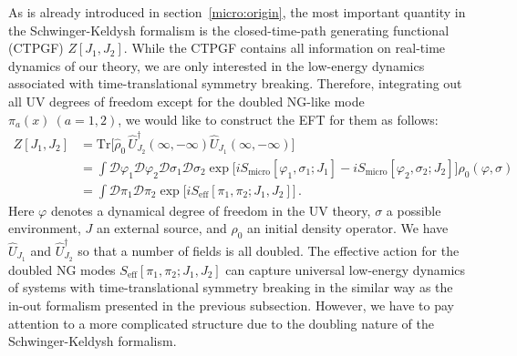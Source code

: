 \documentclass[a4paper,11pt]{article}
\begin{document}
As is already introduced in section~\ref{micro:origin}, 
the most important quantity in the Schwinger-Keldysh formalism is 
the closed-time-path generating functional (CTPGF) $Z[J_1, J_2]$. 
While the CTPGF contains all information on real-time dynamics of our theory, 
we are only interested in the low-energy dynamics associated with 
time-translational symmetry breaking. 
Therefore, integrating out all UV degrees of freedom except for the 
doubled NG-like mode $\pi_a(x) ~(a=1,2)$, 
we would like to construct the EFT for them as follows:
\begin{align}
\nonumber
  Z[J_1, J_2] 
  &= \mathrm{Tr} \Big[\hat{\rho}_0 \,
  \hat{U}_{J_2}^\dagger(\infty,-\infty)
  \hat{U}_{J_1} (\infty,-\infty) \Big]\,  \\
\nonumber
  &=\int \mathcal{D} \varphi_1 \mathcal{D} \varphi_2
  \mathcal{D} \sigma_1 \mathcal{D} \sigma_2
  \exp \Big[
  iS_{\mathrm{micro}} [\varphi_1,\sigma_1;J_1] 
 - iS_{\mathrm{micro}} [\varphi_2,\sigma_2;J_2] \Big]  
  \rho_0 (\varphi,\sigma) 
  \, \\
  &= \int \mathcal{D} \pi_1 \mathcal{D} \pi_2
  \exp \Big[
  iS_{\mathrm{eff}} [\pi_1,\pi_2;J_1,J_2] \Big]\, .
 \label{eq:CTPGF}
\end{align}
Here $\varphi$ denotes a dynamical degree of freedom in the UV theory, 
$\sigma$ a possible environment, $J$ an external source,
and $\rho_0$ an initial density operator. 
We have $\hat{U}_{J_1}$ and $\hat{U}^\dag_{J_2}$  
so that a number of fields is all doubled.  
The effective action for the doubled NG modes 
$S_{\mathrm{eff}} [\pi_1,\pi_2;J_1,J_2]$ can capture universal low-energy 
dynamics of systems with time-translational symmetry breaking 
in the similar way as the in-out formalism presented in the previous subsection.
However, we have to pay attention to a more complicated structure 
due to the doubling nature of the Schwinger-Keldysh formalism.
\end{document}

